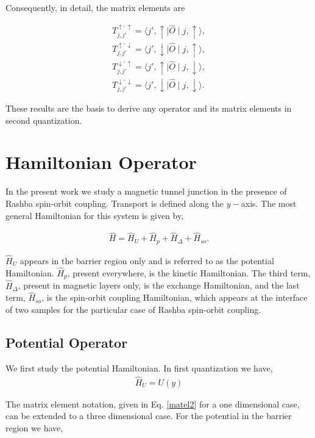 \documentclass[10pt,prb,showpacs,amssymb,floatfix]{revtex4-1}
\newcommand{\Dlt}{\Delta}
\newcommand{\h}{\hat}
\begin{document}
Consequently, in detail, the matrix elements are

\begin{align}
\label{matel30} 
T_{j,j'}^{\uparrow,\uparrow} = \langle j',\uparrow \mid \hat{O} \mid j, \uparrow \rangle, \\
\label{matel31} 
T_{j,j'}^{\uparrow,\downarrow} = \langle j',\downarrow \mid \hat{O} \mid j, \uparrow \rangle, \\
\label{matel32}
T_{j,j'}^{\downarrow,\uparrow} = \langle j',\uparrow \mid \hat{O} \mid j, \downarrow \rangle, \\
T_{j,j'}^{\downarrow,\downarrow} = \langle j',\downarrow \mid \hat{O} \mid j, \downarrow \rangle. 
\label{matel3} 
\end{align}

These results are the basis to derive any operator and its matrix elements in second quantization.

\section{Hamiltonian Operator}
In the present work we study a magnetic tunnel junction in the presence of Rashba spin-orbit coupling. Transport is defined along the $y-$axis. The most general Hamiltonian for this system is given by,

\begin{align}
\h H = \h H_U + \h H_p + \h H_{\Dlt} + \h H_{so}.
\end{align}

$\h H_U$ appears in the barrier region only and is referred to as the potential Hamiltonian. $\h H_p$, present everywhere, is the kinetic Hamiltonian. The third term, $\h H_{\Dlt}$, present in magnetic layers only, is the exchange Hamiltonian, and the last term, $\h H_{so}$, is the spin-orbit coupling Hamiltonian, which appears at the interface of two samples for the particular case of Rashba spin-orbit coupling.

\subsection{Potential Operator}

We first study the potential Hamiltonian. In first quantization we have,
\begin{align}
\hat H_{U} = U(y)
\label{U1st}
\end{align}

The matrix element notation, given in Eq.  \eqref{matel2} for a one dimensional case, can be extended to a three dimensional case. For the potential in the barrier region we have, 
\end{document}
